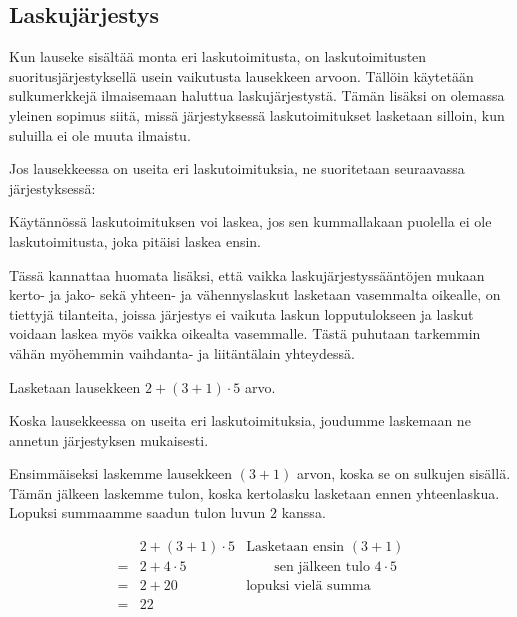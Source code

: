 \subsection*{Laskujärjestys}

Kun lauseke sisältää monta eri laskutoimitusta, on laskutoimitusten suoritusjärjestyksellä usein vaikutusta lausekkeen arvoon. Tällöin käytetään sulkumerkkejä ilmaisemaan haluttua laskujärjestystä. Tämän lisäksi on olemassa yleinen sopimus siitä, missä järjestyksessä laskutoimitukset lasketaan silloin, kun suluilla ei ole muuta ilmaistu.

Jos lausekkeessa on useita eri laskutoimituksia, ne suoritetaan seuraavassa järjestyksessä:


Käytännössä laskutoimituksen voi laskea, jos sen kummallakaan puolella ei ole laskutoimitusta, joka pitäisi laskea ensin.

Tässä kannattaa huomata lisäksi, että vaikka laskujärjestyssääntöjen mukaan kerto- ja jako- sekä yhteen- ja vähennyslaskut lasketaan vasemmalta oikealle, on tiettyjä tilanteita, joissa järjestys ei vaikuta laskun lopputulokseen ja laskut voidaan laskea myös vaikka oikealta vasemmalle. Tästä puhutaan tarkemmin vähän myöhemmin vaihdanta- ja liitäntälain yhteydessä.

\begin{esimerkki}
Lasketaan lausekkeen $2+(3+1)\cdot 5$ arvo.

Koska lausekkeessa on useita eri laskutoimituksia, joudumme laskemaan ne annetun järjestyksen mukaisesti.

Ensimmäiseksi laskemme lausekkeen $(3+1)$ arvon, koska se on sulkujen sisällä. Tämän jälkeen laskemme tulon, koska kertolasku lasketaan ennen yhteenlaskua. Lopuksi summaamme saadun tulon luvun $2$ kanssa.

\begin{align*}
   &2+(3+1)\cdot 5&\textrm{Lasketaan ensin } (3+1)
\\= &2+4\cdot5&\qquad\textrm{sen jälkeen tulo } 4\cdot 5
\\= &2+20& \textrm{lopuksi vielä summa}
\\= &22&
\end{align*}
\end{esimerkki}

